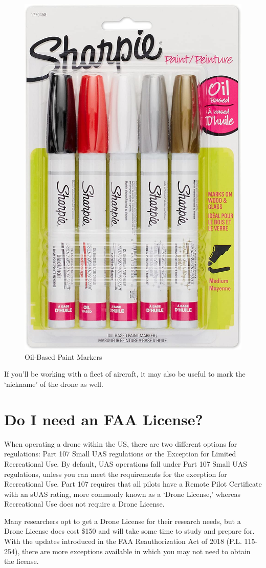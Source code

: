 \documentclass[
]{book}
\begin{document}
\begin{figure}

{\centering \includegraphics[width=0.5\linewidth]{images/oil-based-markers} 

}

\caption{Oil-Based Paint Markers}\label{fig:markers}
\end{figure}

If you'll be working with a fleet of aircraft, it may also be useful to mark the `nickname' of the drone as well.

\hypertarget{ch-license}{%
\chapter{Do I need an FAA License?}\label{ch-license}}

When operating a drone within the US, there are two different options for regulations: Part 107 Small UAS regulations or the Exception for Limited Recreational Use. By default, UAS operations fall under Part 107 Small UAS regulations, unless you can meet the requirements for the exception for Recreational Use. Part 107 requires that all pilots have a Remote Pilot Certificate with an sUAS rating, more commonly known as a `Drone License,' whereas Recreational Use does not require a Drone License.

Many researchers opt to get a Drone License for their research needs, but a Drone License does cost \$150 and will take some time to study and prepare for. With the updates introduced in the FAA Reauthorization Act of 2018 (P.L. 115-254), there are more exceptions available in which you may not need to obtain the license.
\end{document}
